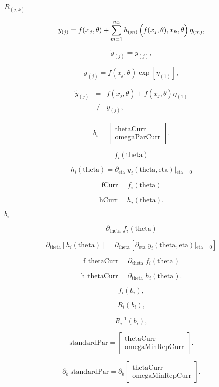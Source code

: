 \documentclass{article}
\begin{document}
$R_{(j,k)}$
\pagebreak

\[ y_{(j)} = f(x_j, \theta) + \sum_{m=1}^{n_{\Omega}} h_{(m)}\left( \rule{0.0in}{0.15in} f(x_j, \theta), x_{k}, \theta \right) \eta_{(m)} , \]
\pagebreak

\[ \widetilde{y}_{(j)} = y_{(j)} , \]
\pagebreak

\[ y_{(j)} = f(x_j, \theta) \exp[ \eta_{(1)} ] , \]
\pagebreak

\begin{eqnarray} \widetilde{y}_{(j)} & = & f(x_j, \theta) + f(x_j, \theta) \eta_{(1)} \\ & \neq & y_{(j)} , \end{eqnarray}
\pagebreak

\[ b_i = \left[ \begin{array}{c} \mbox{thetaCurr} \\ \mbox{omegaParCurr} \end{array} \right] . \]
\pagebreak

\[ f_i(\mbox{theta}) \]
\pagebreak

\[ h_i(\mbox{theta}) = \partial_{\mbox{eta}} \; y_i(\mbox{theta}, \mbox{eta}) \left|_{\mbox{eta}=0} \right. \]
\pagebreak

\[ \mbox{fCurr} = f_i(\mbox{theta}) \]
\pagebreak

\[ \mbox{hCurr} = h_i(\mbox{theta}) . \]
\pagebreak

$b_i$
\pagebreak

\[ \partial_{\mbox{theta}} \; f_i(\mbox{theta}) \]
\pagebreak

\[ \partial_{\mbox{theta}} \left[ h_i(\mbox{theta}) \right] = \partial_{\mbox{theta}} \left[ \partial_{\mbox{eta}} \; y_i(\mbox{theta}, \mbox{eta}) \left|_{\mbox{eta}=0} \right. \right] \]
\pagebreak

\[ \mbox{f_thetaCurr} = \partial_{\mbox{theta}} \; f_i(\mbox{theta}) \]
\pagebreak

\[ \mbox{h_thetaCurr} = \partial_{\mbox{theta}} \; h_i(\mbox{theta}) . \]
\pagebreak

\[ f_i(b_i) , \]
\pagebreak

\[ R_i(b_i) , \]
\pagebreak

\[ R^{-1}_i(b_i) , \]
\pagebreak

\[ \mbox{standardPar} = \left[ \begin{array}{c} \mbox{thetaCurr} \\ \mbox{omegaMinRepCurr} \end{array} \right] . \]
\pagebreak

\[ \partial_b \; \mbox{standardPar} = \partial_b \left[ \begin{array}{c} \mbox{thetaCurr} \\ \mbox{omegaMinRepCurr} \end{array} \right] . \]
\pagebreak
\end{document}
